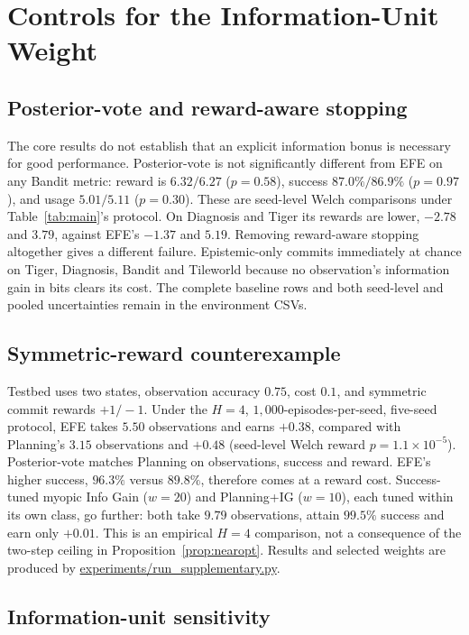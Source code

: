 \section{Controls for the Information-Unit Weight}
\label{app:full_tables}

\subsection{Posterior-vote and reward-aware stopping}

The core results do not establish that an explicit information bonus is necessary for good performance. Posterior-vote is not significantly different from EFE on any Bandit metric: reward is $6.32/6.27$ ($p=0.58$), success $87.0\%/86.9\%$ ($p=0.97$), and usage $5.01/5.11$ ($p=0.30$). These are seed-level Welch comparisons under Table~\ref{tab:main}'s protocol. On Diagnosis and Tiger its rewards are lower, $-2.78$ and $3.79$, against EFE's $-1.37$ and $5.19$. Removing reward-aware stopping altogether gives a different failure. Epistemic-only commits immediately at chance on Tiger, Diagnosis, Bandit and Tileworld because no observation's information gain in bits clears its cost. The complete baseline rows and both seed-level and pooled uncertainties remain in the environment CSVs.

\subsection{Symmetric-reward counterexample}
\label{app:testbed}

Testbed uses two states, observation accuracy $0.75$, cost $0.1$, and symmetric commit rewards $+1/{-}1$. Under the $H=4$, $1{,}000$-episodes-per-seed, five-seed protocol, EFE takes $5.50$ observations and earns $+0.38$, compared with Planning's $3.15$ observations and $+0.48$ (seed-level Welch reward $p=1.1\times10^{-5}$). Posterior-vote matches Planning on observations, success and reward. EFE's higher success, $96.3\%$ versus $89.8\%$, therefore comes at a reward cost. Success-tuned myopic Info Gain ($w=20$) and Planning+IG ($w=10$), each tuned within its own class, go further: both take $9.79$ observations, attain $99.5\%$ success and earn only $+0.01$. This is an empirical $H=4$ comparison, not a consequence of the two-step ceiling in Proposition~\ref{prop:nearopt}. Results and selected weights are produced by \url{experiments/run_supplementary.py}.

\subsection{Information-unit sensitivity}
\label{app:nat_canonical}

